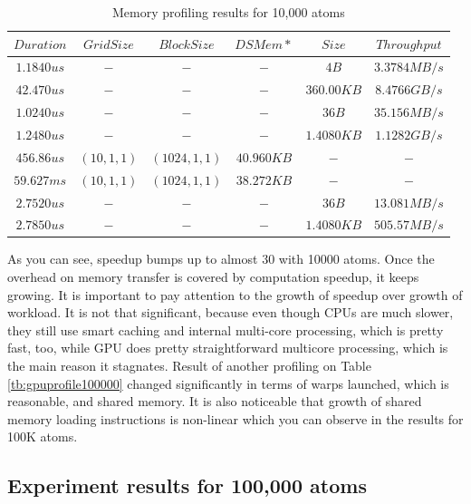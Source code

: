 \documentclass[11pt,a4paper]{report}
\begin{document}
\begin{table}[h!]
	\renewcommand*{\arraystretch}{1.5}
	\tabcolsep=0.12cm
  \centering
  \begin{tabular}{| c | c | c | c | c | c |}
   \hline
   
$Duration $ & $ Grid Size $ & $ Block Size $ & $ DSMem* $ & $ Size $ & $ Throughput  $ \\ \hline
$1.1840us $ & $ - $ & $ - $ & $ - $ & $ 4B $ & $ 3.3784MB/s  $ \\ \hline
$42.470us $ & $ - $ & $ - $ & $ - $ & $ 360.00KB $ & $ 8.4766GB/s  $ \\ \hline
$1.0240us $ & $ - $ & $ - $ & $ - $ & $ 36B $ & $ 35.156MB/s  $ \\ \hline
$1.2480us $ & $ - $ & $ - $ & $ - $ & $ 1.4080KB $ & $ 1.1282GB/s  $ \\ \hline
$456.86us $ & $ (10,1,1) $ & $ (1024,1,1) $ & $ 40.960KB $ & $ - $ & $ -  $ \\ \hline
$59.627ms $ & $ (10,1,1) $ & $ (1024,1,1) $ & $ 38.272KB $ & $ - $ & $ -  $ \\ \hline
$2.7520us $ & $ - $ & $ - $ & $ - $ & $ 36B $ & $ 13.081MB/s  $ \\ \hline
$2.7850us $ & $ - $ & $ - $ & $ - $ & $ 1.4080KB $ & $ 505.57MB/s$ \\ 

	\hline

  \end{tabular}
    \caption{Memory profiling results for 10,000 atoms}
    	  \label{tb:gpumem10000}
\end{table}


As you can see, speedup bumps up to almost 30 with 10000 atoms. Once the overhead on memory transfer is covered by computation speedup, it keeps growing. It is important to pay attention to the growth of speedup over growth of workload. It is not that significant, because even though CPUs are much slower, they still use smart caching and internal multi-core processing, which is pretty fast, too, while GPU does pretty straightforward multicore processing, which is the main reason it stagnates.
Result of another profiling on Table \ref{tb:gpuprofile100000} changed significantly in terms of warps launched, which is reasonable, and shared memory. It is also noticeable that growth of shared memory loading instructions is non-linear which you can observe in the results for 100K atoms.

\subsection{Experiment results for 100,000 atoms}
\end{document}

